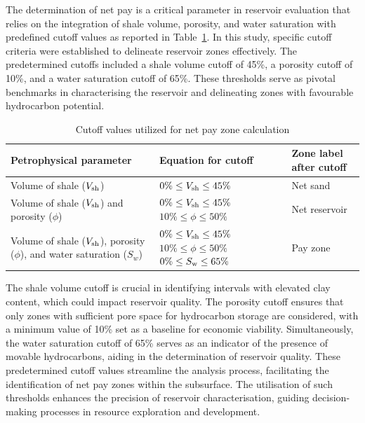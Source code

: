 \documentclass{gji}
\begin{document}
The determination of net pay is a critical parameter in reservoir evaluation that relies on the integration of shale volume, porosity, and water saturation with predefined cutoff values as reported in Table~\ref{tab:net_pay_cutoffs}.
In this study, specific cutoff criteria were established to delineate reservoir zones effectively.
The predetermined cutoffs included a shale volume cutoff of 45\%, a porosity cutoff of 10\%, and a water saturation cutoff of 65\%.
These thresholds serve as pivotal benchmarks in characterising the reservoir and delineating zones with favourable hydrocarbon potential.

\begin{table}%
    \centering
\caption{Cutoff values utilized for net pay zone calculation} \label{tab:net_pay_cutoffs}
    \begin{tabular}{|p{4cm}|p{3cm}|p{4cm}|}
        \hline
        \textbf{Petrophysical parameter} & \textbf{Equation for cutoff} & \textbf{Zone label after cutoff} \\
        \hline
        Volume of shale (\(V_{\rm sh}\)) &  \(0\% \leq V_{\rm sh} \leq 45\%\)\quad & Net sand \\
        \hline
Volume of shale (\(V_{\rm sh}\)) and porosity (\( \phi\)) & \(0\% \leq V_{\rm sh} \leq 45\%\)\quad \(10\% \leq \phi \leq 50\%\) 
         & Net reservoir\\
        \hline
Volume of shale (\(V_{\rm sh}\)), porosity (\( \phi\)), and water saturation (\(S_w\)) & \(0\% \leq V_{\rm sh} \leq 45\%\)\quad \(10\% \leq \phi \leq 50\%\) \quad
        \(0\% \leq S_{\rm w} \leq 65\%\)\quad & Pay zone\\
        \hline
    \end{tabular}
\end{table}
%
The shale volume cutoff is crucial in identifying intervals with elevated clay content, which could impact reservoir quality. 
The porosity cutoff ensures that only zones with sufficient pore space for hydrocarbon storage are considered, with a minimum value of 10\% set as a baseline for economic viability.
Simultaneously, the water saturation cutoff of 65\% serves as an indicator of the presence of movable hydrocarbons, aiding in the determination of reservoir quality.
These predetermined cutoff values streamline the analysis process, facilitating the identification of net pay zones within the subsurface. 
The utilisation of such thresholds enhances the precision of reservoir characterisation, guiding decision-making processes in resource exploration and development.
\end{document}
